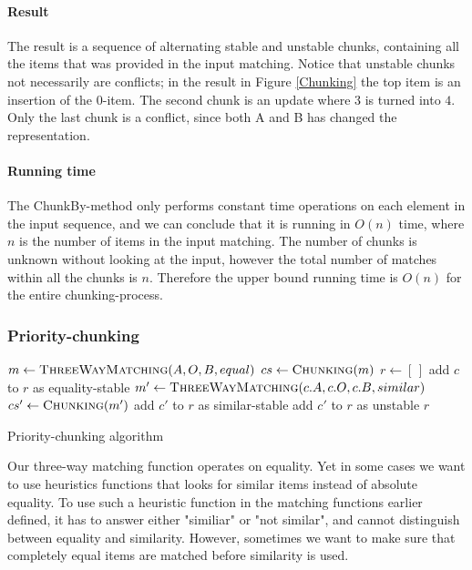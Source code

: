 \documentclass[11pt]{article}
\begin{document}

\paragraph{Result} The result is a sequence of alternating stable and unstable chunks, containing all the items that was provided in the input matching. Notice that unstable chunks not necessarily are conflicts; in the result in Figure \ref{Chunking} the top item is an insertion of the $0$-item. The second chunk is an update where $3$ is turned into $4$. Only the last chunk is a conflict, since both A and B has changed the representation. 

\paragraph{Running time} The ChunkBy-method only performs constant time operations on each element in the input sequence, and we can conclude that it is running in $O(n)$ time, where $n$ is the number of items in the input matching. The number of chunks is unknown without looking at the input, however the total number of matches within all the chunks is $n$. Therefore the upper bound running time is $O(n)$ for the entire chunking-process.

\subsubsection{Priority-chunking}
\label{PriorityDiff}

\begin{algorithm}
\begin{algorithmic}
	\State $m \gets \Call{ThreeWayMatching}{A, O, B, equal}$
	\State $cs \gets \Call{Chunking}{m}$
	\State $r \gets [\,]$
			\State add $c$ to $r$ as equality-stable
		\Else
			\State $m' \gets \Call{ThreeWayMatching}{c.A, c.O, c.B, similar} $
            \State $cs' \gets \Call{Chunking}{m'}$
					\State add $c'$ to $r$ as similar-stable
				\Else
					\State add $c'$ to $r$ as unstable
				\EndIf
			\EndFor
		\EndIf
	\EndFor
	\State \Return $r$
\EndFunction
\end{algorithmic}
	\caption{Priority-chunking algorithm}
	\label{PriorityChunk}
\end{algorithm}

Our three-way matching function operates on equality. Yet in some cases we want to use heuristics functions that looks for similar items instead of absolute equality. To use such a heuristic function in the matching functions earlier defined, it has to answer either "similiar" or "not similar", and cannot distinguish between equality and similarity. However, sometimes we want to make sure that completely equal items are matched before similarity is used.
\end{document}
